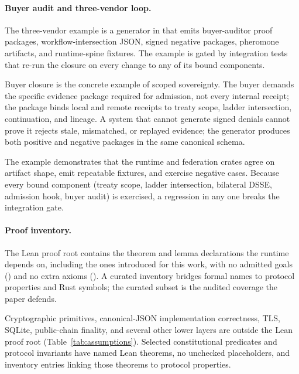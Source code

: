 \paragraph{Buyer audit and three-vendor loop.}
The three-vendor example is a generator in  that emits buyer-auditor proof packages, workflow-intersection JSON, signed negative packages, pheromone artifacts, and runtime-spine fixtures. The example is gated by integration tests that re-run the closure on every change to any of its bound components.

Buyer closure is the concrete example of scoped sovereignty. The buyer demands the specific evidence package required for admission, not every internal receipt; the package binds local and remote receipts to treaty scope, ladder intersection, continuation, and lineage. A system that cannot generate signed denials cannot prove it rejects stale, mismatched, or replayed evidence; the generator produces both positive and negative packages in the same canonical schema.

The example demonstrates that the runtime and federation crates agree on artifact shape, emit repeatable fixtures, and exercise negative cases. Because every bound component (treaty scope, ladder intersection, bilateral DSSE, admission hook, buyer audit) is exercised, a regression in any one breaks the integration gate.

\paragraph{Proof inventory.}
The Lean proof root contains the theorem and lemma declarations the runtime depends on, including the ones introduced for this work, with no admitted goals () and no extra axioms (). A curated inventory bridges formal names to protocol properties and Rust symbols; the curated subset is the audited coverage the paper defends.

Cryptographic primitives, canonical-JSON implementation correctness, TLS, SQLite, public-chain finality, and several other lower layers are outside the Lean proof root (Table~\ref{tab:assumptions}). Selected constitutional predicates and protocol invariants have named Lean theorems, no unchecked placeholders, and inventory entries linking those theorems to protocol properties.

